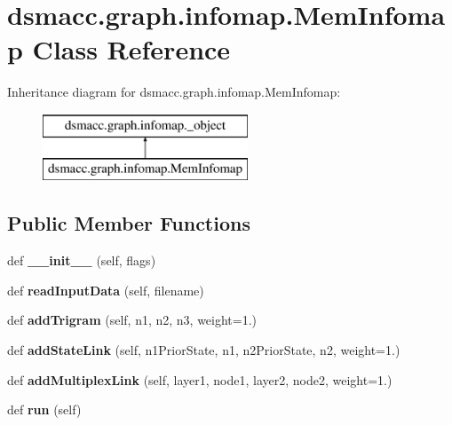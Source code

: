 \hypertarget{classdsmacc_1_1graph_1_1infomap_1_1MemInfomap}{}\section{dsmacc.\+graph.\+infomap.\+Mem\+Infomap Class Reference}
\label{classdsmacc_1_1graph_1_1infomap_1_1MemInfomap}
Inheritance diagram for dsmacc.\+graph.\+infomap.\+Mem\+Infomap\+:\begin{figure}[H]
\begin{center}
\leavevmode
\includegraphics[height=2.000000cm]{classdsmacc_1_1graph_1_1infomap_1_1MemInfomap}
\end{center}
\end{figure}
\subsection*{Public Member Functions}
\begin{DoxyCompactItemize}
\item 
\mbox{\label{classdsmacc_1_1graph_1_1infomap_1_1MemInfomap_a8510134ca5f3d1b1a6c20e568f83508b}} 
def {\bfseries \+\_\+\+\_\+init\+\_\+\+\_\+} (self, flags)
\item 
\mbox{\label{classdsmacc_1_1graph_1_1infomap_1_1MemInfomap_a274cd5df4afb0aacbe658f49a3326a14}} 
def {\bfseries read\+Input\+Data} (self, filename)
\item 
\mbox{\label{classdsmacc_1_1graph_1_1infomap_1_1MemInfomap_ac4a683cc2e01753f868fc6c6cd3fde50}} 
def {\bfseries add\+Trigram} (self, n1, n2, n3, weight=1.)
\item 
\mbox{\label{classdsmacc_1_1graph_1_1infomap_1_1MemInfomap_a441b7e67531c21ff5c643c2bdce261f4}} 
def {\bfseries add\+State\+Link} (self, n1\+Prior\+State, n1, n2\+Prior\+State, n2, weight=1.)
\item 
\mbox{\label{classdsmacc_1_1graph_1_1infomap_1_1MemInfomap_a9cd20d485728d02a3c298e3c25c46016}} 
def {\bfseries add\+Multiplex\+Link} (self, layer1, node1, layer2, node2, weight=1.)
\item 
\mbox{\label{classdsmacc_1_1graph_1_1infomap_1_1MemInfomap_a38b3ccbceeb627c576b36233fd13ea0d}} 
def {\bfseries run} (self)
\end{DoxyCompactItemize}
